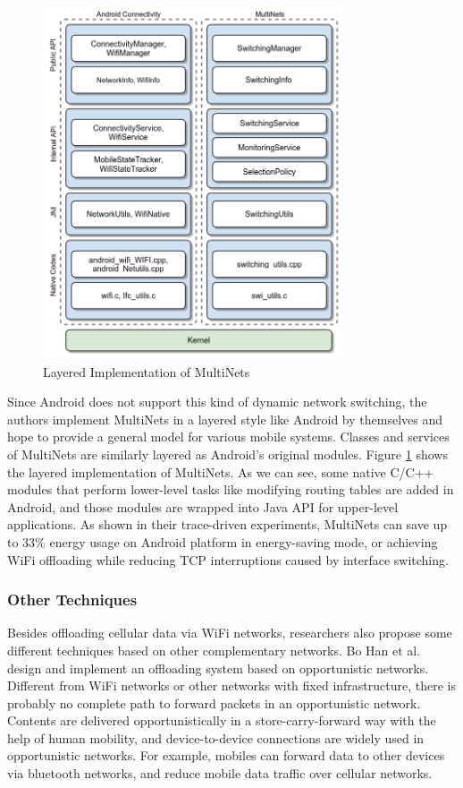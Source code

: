 \documentclass[english]{tktltiki}
\begin{document}
\begin{figure}[htbp]
  \centering
  \includegraphics[width=0.8\textwidth]{images/multinets-layer.png}
  \caption{Layered Implementation of MultiNets \cite{nnh+14}}
  \label{fig:multinets}
\end{figure}

Since Android does not support this kind of dynamic network switching, the authors implement MultiNets in a layered style like Android by themselves and hope to provide a general model for various mobile systems. Classes and services of MultiNets are similarly layered as Android's original modules. Figure \ref{fig:multinets} shows the layered implementation of MultiNets. As we can see, some native C/C++ modules that perform lower-level tasks like modifying routing tables are added in Android, and those modules are wrapped into Java API for upper-level applications. As shown in their trace-driven experiments, MultiNets can save up to 33\% energy usage on Android platform in energy-saving mode, or achieving WiFi offloading while reducing TCP interruptions caused by interface switching.

\subsubsection{Other Techniques}

Besides offloading cellular data via WiFi networks, researchers also propose some different techniques based on other complementary networks. Bo Han et al. \cite{hhk+12} design and implement an offloading system based on opportunistic networks. Different from WiFi networks or other networks with fixed infrastructure, there is probably no complete path to forward packets in an opportunistic network. Contents are delivered opportunistically in a store-carry-forward way with the help of human mobility, and device-to-device connections are widely used in opportunistic networks. For example, mobiles can forward data to other devices via bluetooth networks, and reduce mobile data traffic over cellular networks.
\end{document}
